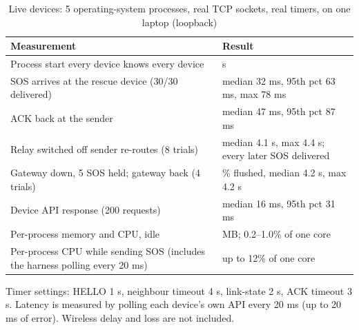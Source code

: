 \begin{table}[htbp]
\caption[Live devices: 5 operating-system processes, real TCP sockets, real timers, on one laptop]{Live devices: 5 operating-system processes, real TCP sockets, real timers, on one laptop (loopback)}
\label{tab:live}
\footnotesize
\setlength{\tabcolsep}{4pt}
\begin{tabular}{@{}>{\raggedright\arraybackslash}p{}>{\raggedright\arraybackslash}p{}@{}}
\toprule
\textbf{Measurement} & \textbf{Result} \\ \midrule
Process start \textrightarrow{} every device knows every device & 4.4 s \\
SOS arrives at the rescue device (30/30 delivered) & median 32 ms, 95th pct 63 ms, max 78 ms \\
ACK back at the sender & median 47 ms, 95th pct 87 ms \\
Relay switched off \textrightarrow{} sender re-routes (8 trials) & median 4.1 s, max 4.4 s; every later SOS delivered \\
Gateway down, 5 SOS held; gateway back (4 trials) & 100\% flushed, median 4.2 s, max 4.2 s \\
Device API response (200 requests) & median 16 ms, 95th pct 31 ms \\
Per-process memory and CPU, idle & 55 MB; 0.2--1.0\% of one core \\
Per-process CPU while sending SOS (includes the harness polling every 20 ms) & up to 12\% of one core \\
\bottomrule
\end{tabular}
\par\smallskip\footnotesize Timer settings: HELLO 1 s, neighbour timeout 4 s, link-state 2 s, ACK timeout 3 s. Latency is measured by polling each device's own API every 20 ms (up to 20 ms of error). Wireless delay and loss are not included.
\end{table}
